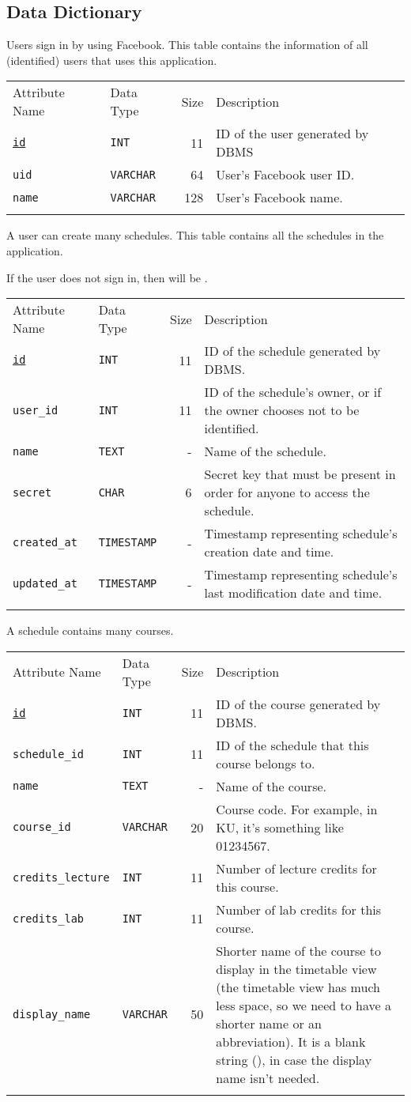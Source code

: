 
\subsection{Data Dictionary}

\newcommand{\TblData}[1]{\begin{center}
  \begin{tabular}{llrp{10cm}}
    \hline \NR
    Attribute Name & Data Type & Size & Description \\\NR
    \hline\NR
      #1
    \hline
  \end{tabular}
\end{center}}
\newcommand{\TblCol}[4]{
  \texttt{#1} & \texttt{#2} & #3 & #4 \\\NR
}




Users sign in by using Facebook.
This table contains the information
of all (identified) users that uses this application.

\TblData{
  \TblCol{\uline{id}}{INT}{11}{
    ID of the user generated by DBMS}
  \TblCol{uid}{VARCHAR}{64}{
    User's Facebook user ID.}
  \TblCol{name}{VARCHAR}{128}{
    User's Facebook name.}
}



A user can create many schedules.
This table contains all the schedules in the application.

If the user does not sign in,
then  will be .


\TblData{
  \TblCol{\uline{id}}{INT}{11}{
    ID of the schedule generated by DBMS.}
  \TblCol{user\_id}{INT}{11}{
    ID of the schedule's owner, or \Code{NULL}
    if the owner chooses not to be identified.}
  \TblCol{name}{TEXT}{-}{
    Name of the schedule.}
  \TblCol{secret}{CHAR}{6}{
    Secret key that must be present in order for anyone to access the schedule.}
  \TblCol{created\_at}{TIMESTAMP}{-}{
    Timestamp representing schedule's creation date and time.}
  \TblCol{updated\_at}{TIMESTAMP}{-}{
    Timestamp representing schedule's last modification date and time.}
}




A schedule contains many courses.

\TblData{
  \TblCol{\uline{id}}{INT}{11}{
    ID of the course generated by DBMS.}
  \TblCol{schedule\_id}{INT}{11}{
    ID of the schedule that this course belongs to.}
  \TblCol{name}{TEXT}{-}{
    Name of the course.}
  \TblCol{course\_id}{VARCHAR}{20}{
    Course code. For example, in KU, it's something like 01234567.}
  \TblCol{credits\_lecture}{INT}{11}{
    Number of lecture credits for this course.}
  \TblCol{credits\_lab}{INT}{11}{
    Number of lab credits for this course.}
  \TblCol{display\_name}{VARCHAR}{50}{
    Shorter name of the course to display in the timetable view
    (the timetable view has much less space, so we need to have a shorter name
    or an abbreviation).
    It is a blank string (\Code{""}),
    in case the display name isn't needed.}
}



